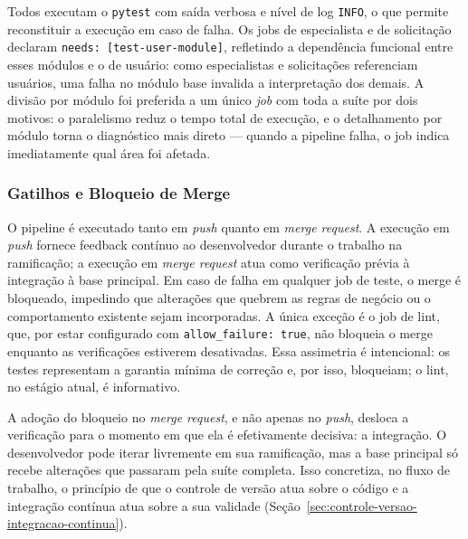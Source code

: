 Todos executam o \texttt{pytest} com saída verbosa e nível de log \texttt{INFO}, o que
permite reconstituir a execução em caso de falha. Os jobs de especialista e de
solicitação declaram \texttt{needs: [test-user-module]}, refletindo a dependência
funcional entre esses módulos e o de usuário: como especialistas e solicitações
referenciam usuários, uma falha no módulo base invalida a interpretação dos demais. A
divisão por módulo foi preferida a um único \textit{job} com toda a suíte por dois
motivos: o paralelismo reduz o tempo total de execução, e o detalhamento por módulo
torna o diagnóstico mais direto — quando a pipeline falha, o job indica imediatamente
qual área foi afetada.


\subsubsection{Gatilhos e Bloqueio de Merge}

O pipeline é executado tanto em \textit{push} quanto em \textit{merge request}. A
execução em \textit{push} fornece feedback contínuo ao desenvolvedor durante o trabalho
na ramificação; a execução em \textit{merge request} atua como verificação prévia à
integração à base principal. Em caso de falha em qualquer job de teste, o merge é
bloqueado, impedindo que alterações que quebrem as regras de negócio ou o comportamento
existente sejam incorporadas. A única exceção é o job de lint, que, por estar
configurado com \texttt{allow\_failure: true}, não bloqueia o merge enquanto as
verificações estiverem desativadas. Essa assimetria é intencional: os testes representam
a garantia mínima de correção e, por isso, bloqueiam; o lint, no estágio atual, é
informativo.

A adoção do bloqueio no \textit{merge request}, e não apenas no \textit{push}, desloca a
verificação para o momento em que ela é efetivamente decisiva: a integração. O
desenvolvedor pode iterar livremente em sua ramificação, mas a base principal só recebe
alterações que passaram pela suíte completa. Isso concretiza, no fluxo de trabalho, o
princípio de que o controle de versão atua sobre o código e a integração contínua atua
sobre a sua validade (Seção~\ref{sec:controle-versao-integracao-continua}).

